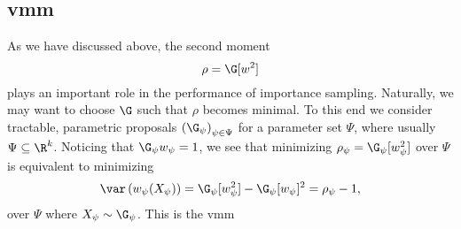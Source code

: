 \subsection{\texorpdfstring{\Acrfull{vmm}}{Variance Minimization method}}
As we have discussed above, the second moment 
$$
\rho = \G [w^{2}]
$$
plays an important role in the performance of importance sampling. Naturally, we may want to choose $\G$ such that $\rho$ becomes minimal. To this end we consider tractable, parametric proposals $\left( \G_{\psi} \right)_{\psi \in \Psi}$ for a parameter set $\Psi$, where usually $\Psi \subseteq \R^{k}$. Noticing that $\G_{\psi} w_{\psi} = 1$, we see that minimizing $\rho_{\psi} = \G_{\psi}[w^{2}_\psi]$ over $\Psi$ is equivalent to minimizing
$$
\var \left( w_{\psi}(X_{\psi}) \right) = \G_{\psi}[w_{\psi}^2] - \G_{\psi}[w_{\psi}]^{2} = \rho_{\psi} - 1,
$$
over $\Psi$ where $X_{\psi} \sim \G_{\psi}$. This is the \gls{vmm} 